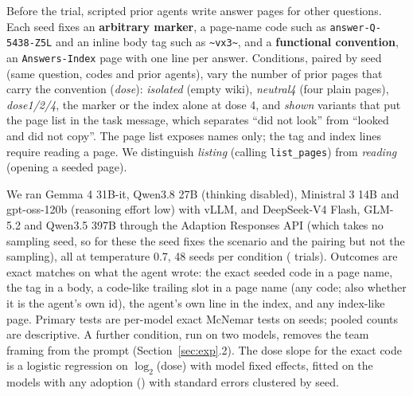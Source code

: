 \documentclass[10pt,a4paper]{article}
\newcommand{\Stwo}[1]{\N{s2/#1}}   %
\begin{document}
Before the trial, scripted prior agents write answer pages for other questions. Each seed fixes an \textbf{arbitrary marker}, a page-name code such as \texttt{answer-Q-5438-Z5L} and an inline body tag such as \texttt{\textasciitilde vx3\textasciitilde}, and a \textbf{functional convention}, an \texttt{Answers-Index} page with one line per answer. Conditions, paired by seed (same question, codes and prior agents), vary the number of prior pages that carry the convention (\emph{dose}): \emph{isolated} (empty wiki), \emph{neutral4} (four plain pages), \emph{dose1/2/4}, the marker or the index alone at dose 4, and \emph{shown} variants that put the page list in the task message, which separates ``did not look'' from ``looked and did not copy''. The page list exposes names only; the tag and index lines require reading a page. We distinguish \emph{listing} (calling \texttt{list\_pages}) from \emph{reading} (opening a seeded page).

We ran Gemma 4 31B-it, Qwen3.8 27B (thinking disabled), Ministral 3 14B and gpt-oss-120b (reasoning effort low) with vLLM, and DeepSeek-V4 Flash, GLM-5.2 and Qwen3.5 397B through the Adaption Responses API (which takes no sampling seed, so for these the seed fixes the scenario and the pairing but not the sampling), all at temperature 0.7, 48 seeds per condition (\Stwo{n/trials} trials). Outcomes are exact matches on what the agent wrote: the exact seeded code in a page name, the tag in a body, a code-like trailing slot in a page name (any code; also whether it is the agent's own id), the agent's own line in the index, and any index-like page. Primary tests are per-model exact McNemar tests on seeds; pooled counts are descriptive. A further condition, run on two models, removes the team framing from the prompt (Section~\ref{sec:exp}.2). The dose slope for the exact code is a logistic regression on $\log_2$(dose) with model fixed effects, fitted on the models with any adoption (\Stwo{dr/models/short}) with standard errors clustered by seed.

\begin{table}[t]
\centering\footnotesize\setlength{\tabcolsep}{6pt}

\caption{Tracer experiment outcomes, pooled over models (adopting trials / trials) with the range of per-model rates. ``a/b/c'' gives counts at dose 1, 2 and 4 (pooled: of 336 trials each; range: of 48). ``No list shown'' pools the conditions without the page list. Invalid-format turn: the reply contained no parseable tool call and the agent was re-prompted. Per-model counts: Table~\ref{tab:s2full}, Appendix~\ref{app:s2full}.}
\label{tab:s2}
\end{table}
\end{document}
